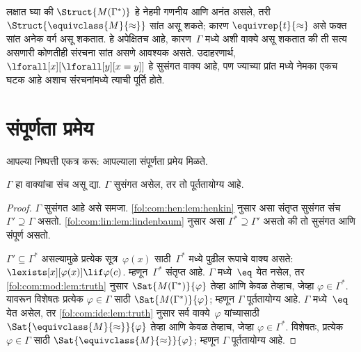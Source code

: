 \begin{digress}
लक्षात घ्या की $\Struct{M(\Gamma^*)}$ हे नेहमी गणनीय आणि अनंत
असले, तरी $\Struct{\equivclass{M}{\approx}}$ सांत असू शकते; कारण
$\equivrep{t}{\approx}$ असे फक्त सांत अनेक वर्ग असू शकतात. हे अपेक्षितच
आहे, कारण~$\Gamma$ मध्ये अशी वाक्ये असू शकतात की ती सत्य असणारी
कोणतीही संरचना सांत असणे आवश्यक असते. उदाहरणार्थ,
$\lforall[x][\lforall[y][x = y]]$ हे सुसंगत वाक्य आहे, पण ज्याच्या
प्रांत मध्ये नेमका एकच घटक आहे अशाच संरचनांमध्ये
त्याची पूर्ति होते.
\end{digress}












\section{संपूर्णता प्रमेय}\label{fol:com:cth:sec}

\begin{explain}
आपल्या निष्पत्ती एकत्र करू: आपल्याला संपूर्णता प्रमेय मिळते.
\end{explain}

\begin{thm}[संपूर्णता प्रमेय]
\label{fol:com:cth:thm:completeness}
$\Gamma$ हा वाक्यांचा संच असू द्या. $\Gamma$ सुसंगत असेल, तर
तो पूर्ततायोग्य आहे.
\end{thm}

\begin{proof}
$\Gamma$ सुसंगत आहे असे समजा.
  \ref{fol:com:hen:lem:henkin} नुसार असा संतृप्त सुसंगत संच
  $\Gamma' \supseteq \Gamma$ असतो. \ref{fol:com:lin:lem:lindenbaum} नुसार
असा $\Gamma^* \supseteq \Gamma'$ असतो की तो
सुसंगत आणि संपूर्ण असतो.

  $\Gamma' \subseteq \Gamma^*$ असल्यामुळे प्रत्येक
  सूत्र~$\varphi(x)$ साठी~$\Gamma^*$ मध्ये पुढील रूपाचे वाक्य
  असते:
  $\lexists[x][\varphi(x)] \lif \varphi(c)$.
  म्हणून~$\Gamma^*$ संतृप्त आहे. $\Gamma$ मध्ये~$\eq$ येत नसेल, तर
\ref{fol:com:mod:lem:truth} नुसार
$\Sat{M(\Gamma^*)}{\varphi}$ तेव्हा आणि केवळ तेव्हाच, जेव्हा $\varphi \in
\Gamma^*$. यावरून विशेषतः प्रत्येक $\varphi \in \Gamma$ साठी
$\Sat{M(\Gamma^*)}{\varphi}$; म्हणून
$\Gamma$ पूर्ततायोग्य आहे.
  $\Gamma$ मध्ये~$\eq$ येत असेल, तर \ref{fol:com:ide:lem:truth} नुसार
  सर्व वाक्ये~$\varphi$ यांच्यासाठी
  $\Sat{\equivclass{M}{\approx}}{\varphi}$ तेव्हा आणि केवळ तेव्हाच, जेव्हा
  $\varphi \in \Gamma^*$. विशेषतः, प्रत्येक $\varphi \in \Gamma$ साठी
  $\Sat{\equivclass{M}{\approx}}{\varphi}$; म्हणून $\Gamma$ पूर्ततायोग्य आहे.
\end{proof}

